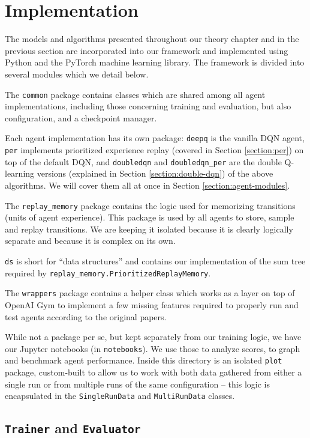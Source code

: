 \section{Implementation} \label{section:implementation}
The models and algorithms presented throughout our theory chapter and in the previous section are incorporated into our framework and implemented using Python and the PyTorch machine learning library.
The framework is divided into several modules which we detail below.

The \verb|common| package contains classes which are shared among all agent implementations, including those concerning training and evaluation, but also configuration, and a checkpoint manager.

Each agent implementation has its own package: \verb|deepq| is the vanilla DQN agent, \verb|per| implements prioritized experience replay (covered in Section \ref{section:per}) on top of the default DQN, and \verb|doubledqn| and \verb|doubledqn_per| are the double Q-learning versions (explained in Section \ref{section:double-dqn}) of the above algorithms.
We will cover them all at once in Section \ref{section:agent-modules}.

The \verb|replay_memory| package contains the logic used for memorizing transitions (units of agent experience).
This package is used by all agents to store, sample and replay transitions.
We are keeping it isolated because it is clearly logically separate and because it is complex on its own.

\verb|ds| is short for ``data structures'' and contains our implementation of the sum tree required by \verb|replay_memory.PrioritizedReplayMemory|.

The \verb|wrappers| package contains a helper class which works as a layer on top of OpenAI Gym to implement a few missing features required to properly run and test agents according to the original papers.

While not a package per se, but kept separately from our training logic, we have our Jupyter notebooks (in \verb|notebooks|).
We use those to analyze scores, to graph and benchmark agent performance.
Inside this directory is an isolated \verb|plot| package, custom-built to allow us to work with both data gathered from either a single run or from multiple runs of the same configuration -- this logic is encapsulated in the \verb|SingleRunData| and \verb|MultiRunData| classes.

\subsection{\texttt{Trainer} and \texttt{Evaluator}}

